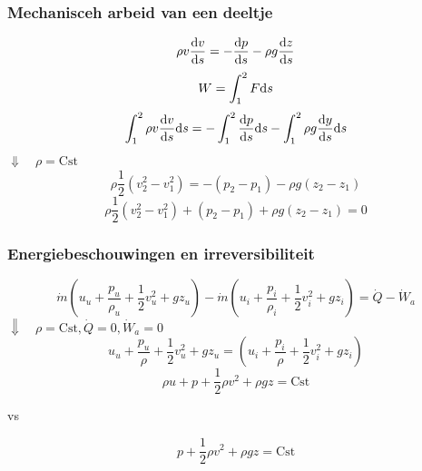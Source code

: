 \documentclass[t]{beamer}
\begin{document}
	\begin{frame}
		\frametitle{Mechanisceh arbeid van een deeltje}
		\begin{equation*}
			\rho v \frac{\mathrm{d} v}{\mathrm{d} s} = - \frac{\mathrm{d} p}{\mathrm{d} s} - \rho g \frac{\mathrm{d} z}{\mathrm{d} s}
		\end{equation*}
		\begin{equation*}
			W = \int_1^2 F \mathrm{d} s
		\end{equation*}				
		\pause
		\begin{equation*}
			\int_1^2 \rho v \frac{\mathrm{d} v}{\mathrm{d} s} \mathrm{d} s = - \int_1^2 \frac{\mathrm{d} p}{\mathrm{d} s} \mathrm{d} s - \int_1^2 \rho g \frac{\mathrm{d} y}{\mathrm{d} s} \mathrm{d} s
		\end{equation*}
		\pause
            \hspace{5cm} $\Downarrow \quad \rho = \text{Cst}$ 
            \begin{equation*}
			\rho \frac{1}{2} (v_2^2-v_1^2)  = - (p_2-p_1) - \rho g (z_2-z_1)
		\end{equation*}
		\pause
		\begin{equation}
			\rho \frac{1}{2} (v_2^2-v_1^2) + (p_2-p_1) + \rho g (z_2-z_1) = 0
			\label{eqn:kinetische energie en arbeid}
		\end{equation}
  		\end{frame}
	\begin{frame}
		\frametitle{Energiebeschouwingen en irreversibiliteit}
		\begin{equation*}
			\dot{m} (u_u + \frac{p_u}{\rho_u} + \frac{1}{2}v^2_u + g z_u) - \dot{m} (u_i + \frac{p_i}{\rho_i}+ \frac{1}{2}v^2_i + g z_i) = \dot{Q}-\dot{W}_a
		\end{equation*}
			\hspace{5cm} $\Downarrow \quad \rho = \text{Cst}, \dot{Q} = 0, \dot{W}_a = 0$ 
		\begin{equation*}
			u_u + \frac{p_u}{\rho} + \frac{1}{2}v^2_u + g z_u = (u_i + \frac{p_i}{\rho}+ \frac{1}{2}v^2_i + g z_i)
		\end{equation*}
		\begin{equation*}
			\rho u + p + \frac{1}{2} \rho v^2 + \rho g z = \text{Cst}
		\end{equation*}
		\begin{center}
			vs
		\end{center}
		\begin{equation*}
			p + \frac{1}{2} \rho v^2 + \rho g z = \text{Cst}
		\end{equation*}
	\end{frame}
\end{document}
